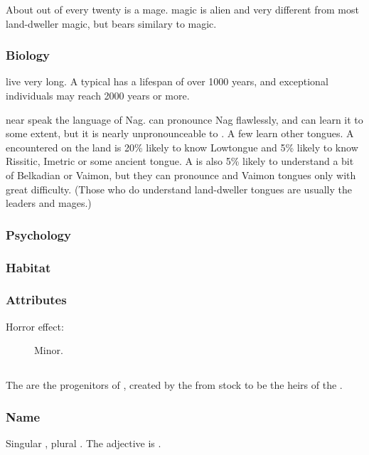 About \naga{} out of every twenty is a mage. \Naga{} magic is alien and very different from most land-dweller magic, but bears similary to \draconic{} magic. 

\subsubsection{Biology}
\Nagae{} live very long. A typical \naga{} has a lifespan of over 1000 years, and exceptional individuals may reach 2000 years or more. 

\Nagae{} near \KnownWorld{} speak the language of Nag. \Dragons{} can pronounce Nag flawlessly, and \scathae{} can learn it to some extent, but it is nearly unpronounceable to \humans{}. A few \nagae{} learn other tongues. A \naga{} encountered on the land is 20\% likely to know \Draconic{} Lowtongue and 5\% likely to know Rissitic, Imetric or some ancient \scathaese{} tongue. A \naga{} is also 5\% likely to understand a bit of Belkadian or Vaimon, but they can pronounce \human{} and Vaimon tongues only with great difficulty. (Those \nagae{} who do understand land-dweller tongues are usually the leaders and mages.) 

\subsubsection{Psychology}

\subsubsection{Habitat}
\subsubsection{Attributes}
\begin{description}
	\item[Horror effect:] Minor. 
\end{description}



\subsection{\Resphan}
\label{Resphan}
\label{Resphain}
The \resphain{} are the progenitors of \humans{}, created by the \banes{} from \Nephil{} stock to be the heirs of the \banes{}. 

\subsubsection{Name}
Singular \emph{\resphan}, plural \emph{\resphain}. The adjective is \emph{\resphadj}. 

